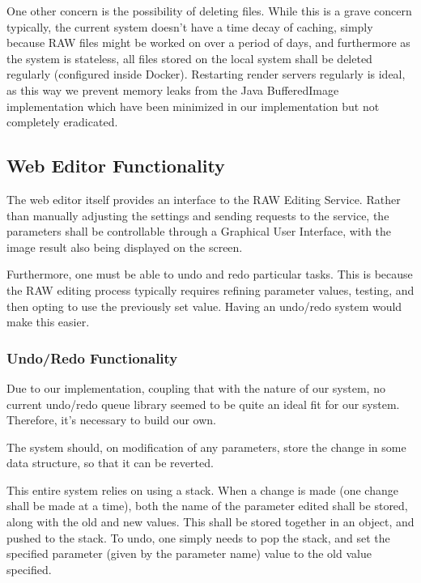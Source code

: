\documentclass[10pt,a4paper]{article}
\begin{document}
One other concern is the possibility of deleting files. While this is a grave concern typically, the current system doesn't have a time decay of caching,
simply because RAW files might be worked on over a period of days, and furthermore as the system is stateless, all files stored on the local system shall be
deleted regularly (configured inside Docker). Restarting render servers regularly is ideal, as this way we prevent memory leaks from the Java BufferedImage implementation
which have been minimized in our implementation but not completely eradicated.

\subsection{Web Editor Functionality}

The web editor itself provides an interface to the RAW Editing Service. Rather than
manually adjusting the settings and sending requests to the service, the parameters shall
be controllable through a Graphical User Interface, with the image result also being displayed
on the screen.

Furthermore, one must be able to undo and redo particular tasks. This is because the RAW editing
process typically requires refining parameter values, testing, and then opting to use the previously
set value. Having an undo/redo system would make this easier.

\subsubsection{Undo/Redo Functionality}
Due to our implementation, coupling that with the nature of our system, no current undo/redo queue library
seemed to be quite an ideal fit for our system. Therefore, it's necessary to build our own.

The system should, on modification of any parameters, store the change in some data structure,
so that it can be reverted.

This entire system relies on using a stack. When a change is made (one change shall be made at a time),
both the name of the parameter edited shall be stored, along with the old and new values. This shall be
stored together in an object, and pushed to the stack. To undo, one simply needs to pop the stack, and
set the specified parameter (given by the parameter name) value to the old value specified. 
\end{document}

